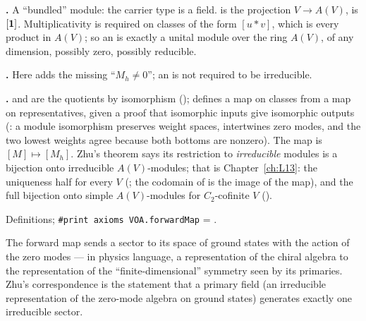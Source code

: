 \begin{dictionary}
\textbf{.} A ``bundled'' module: the carrier type is a field.  is the projection
$V\to A(V)$,  is $[\mathbf{1}]$. Multiplicativity is required on classes of the form $[u*v]$, which is
every product in $A(V)$; so an  is exactly a unital module over the ring $A(V)$, of any dimension,
possibly zero, possibly reducible.

\textbf{.} Here  adds the missing ``$M_h\neq0$''; an  is not
required to be irreducible.

\textbf{.}  and  are the quotients by
isomorphism ();  defines a map on classes from a map on representatives,
given a proof that isomorphic inputs give isomorphic outputs (: a module
isomorphism preserves weight spaces, intertwines zero modes, and the two lowest weights agree because both
bottoms are nonzero). The map is $[M]\mapsto[M_h]$. Zhu's theorem says its restriction to
\emph{irreducible} modules is a bijection onto irreducible $A(V)$-modules; that is Chapter~\ref{ch:L13}: the
uniqueness half for every $V$ (; the codomain of  is the image of the
map), and the full bijection onto simple $A(V)$-modules for $C_2$-cofinite $V$ ().
\end{dictionary}

\begin{status}
Definitions; \texttt{\#print axioms VOA.forwardMap} = .
\end{status}

\begin{physics}
The forward map sends a sector to its space of ground states with the action of the zero modes --- in physics
language, a representation of the chiral algebra to the representation of the ``finite-dimensional'' symmetry
seen by its primaries. Zhu's correspondence is the statement that a primary field (an irreducible
representation of the zero-mode algebra on ground states) generates exactly one irreducible sector.
\end{physics}

